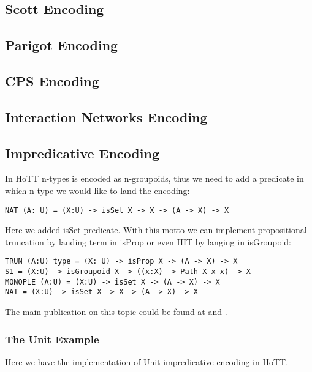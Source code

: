 \documentclass{article}
\begin{document}
\subsection{Scott Encoding}

\subsection{Parigot Encoding}

\subsection{CPS Encoding}

\subsection{Interaction Networks Encoding}

\subsection{Impredicative Encoding}

In HoTT n-types is encoded as n-groupoids, thus we need to add a predicate in which n-type
we would like to land the encoding:

\begin{lstlisting}[mathescape=true]
NAT (A: U) = (X:U) -> isSet X -> X -> (A -> X) -> X
\end{lstlisting}

Here we added isSet predicate. With this motto we can implement propositional
truncation by landing term in isProp or even HIT by langing in isGroupoid:

\begin{lstlisting}[mathescape=true]
TRUN (A:U) type = (X: U) -> isProp X -> (A -> X) -> X
S1 = (X:U) -> isGroupoid X -> ((x:X) -> Path X x x) -> X
MONOPLE (A:U) = (X:U) -> isSet X -> (A -> X) -> X
NAT = (X:U) -> isSet X -> X -> (A -> X) -> X
\end{lstlisting}

The main publication on this topic could be found at \cite{Awodey17} and \cite{Speight17}.

\subsubsection*{The Unit Example}

Here we have the implementation of Unit impredicative encoding in HoTT.
\end{document}
